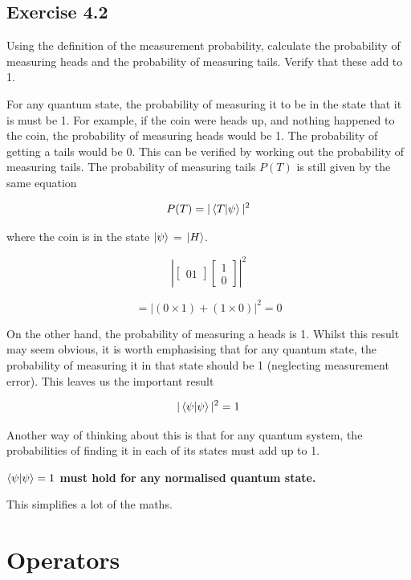 \documentclass{book}
\begin{document}
\hline

\subsection{Exercise 4.2}

Using the definition of the measurement probability, calculate the probability of measuring heads and the probability of measuring tails. Verify that these add to 1. \newline

\hline  
\hspace{10}

For any quantum state, the probability of measuring it to be in the state that it is must be 1. For example, if the coin were heads up, and nothing happened to the coin, the probability of measuring heads would be 1. The probability of getting a tails would be 0. This can be verified by working out the probability of measuring tails. The probability of measuring tails $P(T)$ is still given by the same equation 

$$ P(T) = |\braket{T|\psi}|^2 $$ 

where the coin is in the state $\ket{\psi}$ = $\ket{H}$. 

$$  
\left| \begin{bmatrix} 0  1 \end{bmatrix} \begin{bmatrix} 1 \\ 0 \end{bmatrix} \right|^2 
$$

$$
= \left| (0 \times 1) + (1 \times 0) \right|^2 = 0 
$$


On the other hand, the probability of measuring a heads is 1. Whilst this result may seem obvious, it is worth emphasising that for any quantum state, the probability of measuring it in that state should be 1 (neglecting measurement error). This leaves us the important result

$$ |\braket{\psi|\psi}|^2 = 1 $$

Another way of thinking about this is that for any quantum system, the probabilities of finding it in each of its states must add up to 1. 

\textbf{$ \braket{\psi|\psi} = 1 $ must hold for any normalised quantum state.}

This simplifies a lot of the maths. 

\section{ Operators }
\end{document}
